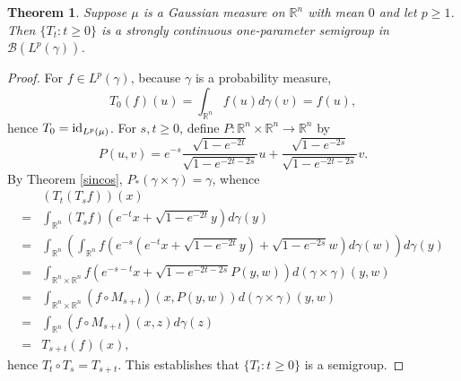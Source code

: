 \documentclass{article}
\newcommand{\id}{\ensuremath\mathrm{id}}
\newtheorem{theorem}{Theorem}
\theoremstyle{definition}
\begin{document}
\begin{theorem}
Suppose $\mu$ is a Gaussian measure on $\mathbb{R}^n$ with mean $0$ and let $p\geq 1$. 
Then 
$\{T_t:t \geq 0\}$ is a strongly continuous one-parameter semigroup in $\mathscr{B}(L^p(\gamma))$. 
\label{semigroup}
\end{theorem}
\begin{proof}
For $f \in L^p(\gamma)$, because $\gamma$ is a probability measure,
\[
T_0(f)(u) = 
 \int_{\mathbb{R}^n} f(u) d\gamma(v)
=f(u),
\]
hence $T_0 = \id_{L^p(\mu)}$. For $s,t \geq 0$,
define $P:\mathbb{R}^n \times \mathbb{R}^n \to \mathbb{R}^n$ by
\[
P(u,v) = e^{-s} \frac{\sqrt{1-e^{-2t}}}{\sqrt{1-e^{-2t-2s}}} u + \frac{\sqrt{1-e^{-2s}}}{\sqrt{1-e^{-2t-2s}}}v.
\]
By Theorem \ref{sincos}, $P_*(\gamma \times \gamma)=\gamma$, whence
\[
\begin{split}
&(T_t(T_s f))(x)\\
=&\int_{\mathbb{R}^n} (T_s f)\left(e^{-t}x+\sqrt{1-e^{-2t}}y \right)d\gamma(y)\\
=&\int_{\mathbb{R}^n} \left( \int_{\mathbb{R}^n} 
f\left(e^{-s}\left(e^{-t}x+\sqrt{1-e^{-2t}}y\right)+\sqrt{1-e^{-2s}}w\right) d\gamma(w) \right) d\gamma(y)\\
=&\int_{\mathbb{R}^n \times \mathbb{R}^n} f\left(e^{-s-t}x+\sqrt{1-e^{-2t-2s}} P(y,w) \right)
d(\gamma \times \gamma)(y,w)\\
=&\int_{\mathbb{R}^n \times \mathbb{R}^n} (f \circ M_{s+t})(x,P(y,w)) d(\gamma \times \gamma)(y,w)\\
=&\int_{\mathbb{R}^n} (f \circ M_{s+t})(x,z)  d\gamma(z)\\
=&T_{s+t}(f)(x),
\end{split}
\]
hence $T_t \circ T_s = T_{s+t}$. This establishes that $\{T_t: t \geq 0\}$ is a semigroup. 


\end{proof}
\end{document}
